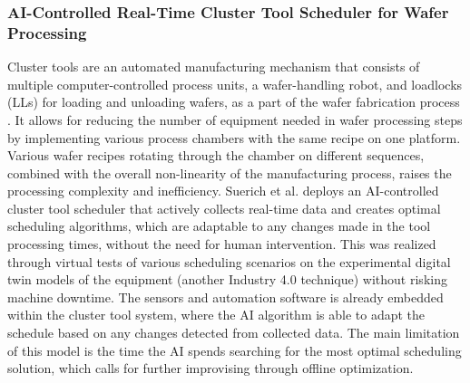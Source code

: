 \subsubsection{AI-Controlled Real-Time Cluster Tool Scheduler for Wafer Processing}
Cluster tools are an automated manufacturing mechanism that consists of multiple computer-controlled process units, a wafer-handling robot, and loadlocks (LLs) for loading and unloading wafers, as a part of the wafer fabrication process \cite{Pan2018-ua}. It allows for reducing the number of equipment needed in wafer processing steps by implementing various process chambers with the same recipe on one platform. Various wafer recipes rotating through the chamber on  different sequences, combined with the overall non-linearity of the manufacturing process, raises the processing complexity and inefficiency. Suerich et al. 
 \cite{Suerich2022ArtificialIF} deploys an AI-controlled cluster tool scheduler that actively collects real-time data and creates optimal scheduling algorithms, which are adaptable to any changes made in the tool processing times, without the need for human intervention. This was realized through virtual tests of various scheduling scenarios on the experimental digital twin models of the equipment (another Industry 4.0 technique) without risking machine downtime. The sensors and automation software is already embedded within the cluster tool system, where the AI algorithm is able to adapt the schedule based on any changes detected from collected data. The main limitation of this model is the time the AI spends searching for the most optimal scheduling solution, which calls for further improvising through offline optimization.

